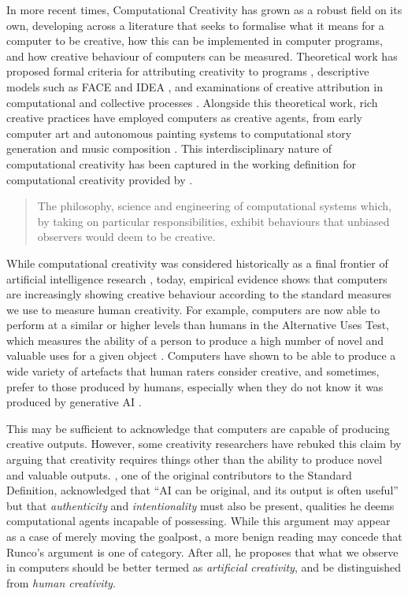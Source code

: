 In more recent times, Computational Creativity has grown as a robust field on its own, developing across a literature that seeks to formalise what it means for a computer to be creative, how this can be implemented in computer programs, and how creative behaviour of computers can be measured. Theoretical work has proposed formal criteria for attributing creativity to programs \citep{Ritchie2007-jy, Jordanous2012-kw}, descriptive models such as FACE and IDEA \citep{Colton2008-fh, Colton2011-uy}, and examinations of creative attribution in computational and collective processes \citep{Maher2012-oj}. Alongside this theoretical work, rich creative practices have employed computers as creative agents, from early computer art \citep{Reichardt1968-eo} and autonomous painting systems \citep{Cohen1995-wt, Colton2015-qr} to computational story generation \citep{Perez-y-Perez1999-ma} and music composition \citep{Cope1992-pq}. This interdisciplinary nature of computational creativity has been captured in the working definition for computational creativity provided by \citet{Colton2012-fx}.

\begin{quote}
The philosophy, science and engineering of computational systems which, by taking on particular responsibilities, exhibit behaviours that unbiased observers would deem to be creative.
\end{quote}

While computational creativity was considered historically as a final frontier of artificial intelligence research \citep{Colton2021-bt}, today, empirical evidence shows that computers are increasingly showing creative behaviour according to the standard measures we use to measure human creativity. For example, computers are now able to perform at a similar or higher levels than humans in the Alternative Uses Test, which measures the ability of a person to produce a high number of novel and valuable uses for a given object \citep{Hubert2024-kv, Guzik2023-cl}. Computers have shown to be able to produce a wide variety of artefacts that human raters consider creative, and sometimes, prefer to those produced by humans, especially when they do not know it was produced by generative AI \citep{Alexander2024-pz, Wu2025-or, Kobis2021-bb}. 

This may be sufficient to acknowledge that computers are capable of producing creative outputs. However, some creativity researchers have rebuked this claim by arguing that creativity requires things other than the ability to produce novel and valuable outputs. \citet{Runco2025-bu}, one of the original contributors to the Standard Definition, acknowledged that ``AI can be original, and its output is often useful'' but that \emph{authenticity} and \emph{intentionality} must also be present, qualities he deems computational agents incapable of possessing. While this argument may appear as a case of merely moving the goalpost, a more benign reading may concede that Runco's argument is one of category. After all, he proposes that what we observe in computers should be better termed as \textit{artificial creativity}, and be distinguished from \textit{human creativity}. 

